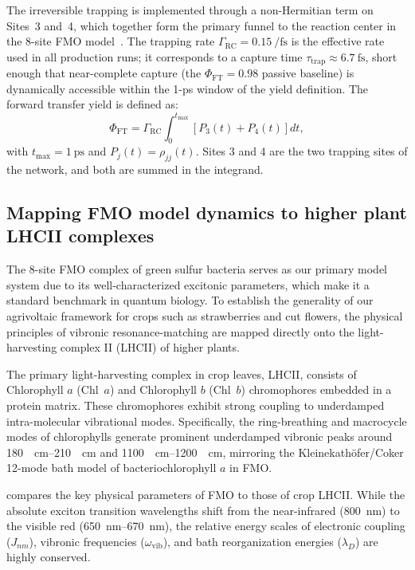 \documentclass[11pt,a4paper]{article}
\begin{document}
The irreversible trapping is implemented through a non-Hermitian term on Sites~3 and~4, which together form the primary funnel to the reaction center in the 8-site FMO model~\cite{Renger2003,Moix2011}.
The trapping rate $\Gamma_{\mathrm{RC}} = \qty{0.15}{\per\fs}$ is the effective rate used in all production runs; it corresponds to a capture time $\tau_{\mathrm{trap}} \approx \qty{6.7}{\fs}$, short enough that near-complete capture (the $\Phi_{\mathrm{FT}} = 0.98$ passive baseline) is dynamically accessible within the 1-ps window of the yield definition.
The forward transfer yield is defined as:
\begin{equation}
\Phi_{\mathrm{FT}} = \Gamma_{\mathrm{RC}} \int_0^{t_{\mathrm{max}}} \left[ P_3(t) + P_4(t) \right] dt,
\label{eq:SI_phi_ft}
\end{equation}
with $t_{\mathrm{max}} = \qty{1}{\ps}$ and $P_j(t) = \rho_{jj}(t)$.
Sites 3 and 4 are the two trapping sites of the network, and both are summed in the integrand.

\subsection{Mapping FMO model dynamics to higher plant LHCII complexes}
\label{SI-sec:lhcii}

The 8-site FMO complex of green sulfur bacteria serves as our primary model system due to its well-characterized excitonic parameters, which make it a standard benchmark in quantum biology. To establish the generality of our agrivoltaic framework for crops such as strawberries and cut flowers, the physical principles of vibronic resonance-matching are mapped directly onto the light-harvesting complex II (LHCII) of higher plants.

The primary light-harvesting complex in crop leaves, LHCII, consists of Chlorophyll $a$ (Chl~$a$) and Chlorophyll $b$ (Chl~$b$) chromophores embedded in a protein matrix. These chromophores exhibit strong coupling to underdamped intra-molecular vibrational modes. Specifically, the ring-breathing and macrocycle modes of chlorophylls generate prominent underdamped vibronic peaks around \qtyrange{180}{210}{\per\cm} and \qtyrange{1100}{1200}{\per\cm}, mirroring the Kleinekathöfer/Coker 12-mode bath model of bacteriochlorophyll $a$ in FMO.

 compares the key physical parameters of FMO to those of crop LHCII. While the absolute exciton transition wavelengths shift from the near-infrared (\qty{800}{\nm}) to the visible red (\qtyrange{650}{670}{\nm}), the relative energy scales of electronic coupling ($J_{nm}$), vibronic frequencies ($\omega_{\mathrm{vib}}$), and bath reorganization energies ($\lambda_D$) are highly conserved.
\end{document}
